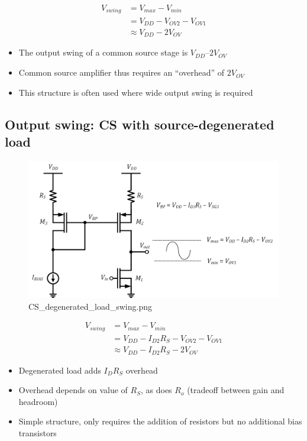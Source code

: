\documentclass[11pt]{article}
\begin{document}
    \begin{align}
V_{swing} &= V_{max} - V_{min}\\
&= V_{DD} - V_{OV2} - V_{OV1}\\
&\approx \boxed{ V_{DD} - 2V_{OV} }
\end{align}

    \begin{itemize}
\item
  The output swing of a common source stage is \(V_{DD} – 2V_{OV}\)
\item
  Common source amplifier thus requires an ``overhead'' of \(2V_{OV}\)
\item
  This structure is often used where wide output swing is required
\end{itemize}

    \hypertarget{output-swing-cs-with-source-degenerated-load}{%
\subsection{Output swing: CS with source-degenerated
load}\label{output-swing-cs-with-source-degenerated-load}}

    \begin{figure}
\centering
\includegraphics{CS_degenerated_load_swing.png}
\caption{CS\_degenerated\_load\_swing.png}
\end{figure}

    \begin{align}
V_{swing} &= V_{max} - V_{min}\\
&= V_{DD} - I_{D2}R_S - V_{OV2} - V_{OV1}\\
&\approx \boxed{ V_{DD} - I_{D2}R_S - 2V_{OV} }
\end{align}

    \begin{itemize}
\item
  Degenerated load adds \(I_D R_S\) overhead
\item
  Overhead depends on value of \(R_S\), as does \(R_o\) (tradeoff
  between gain and headroom)
\item
  Simple structure, only requires the addition of resistors but no
  additional bias transistors
\end{itemize}
\end{document}
